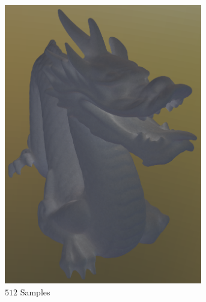 		\begin{figure}[h]
			\begin{subfigure}[b]{0.33\textwidth}
				\center
				\includegraphics[width=0.95\textwidth]{pic/irr_est-rc-dragon2-s512-err.png}
				\caption{$512$ Samples}
			\end{subfigure}
			\begin{subfigure}[b]{0.33\textwidth}
				\center

\end{subfigure}
\end{figure}
